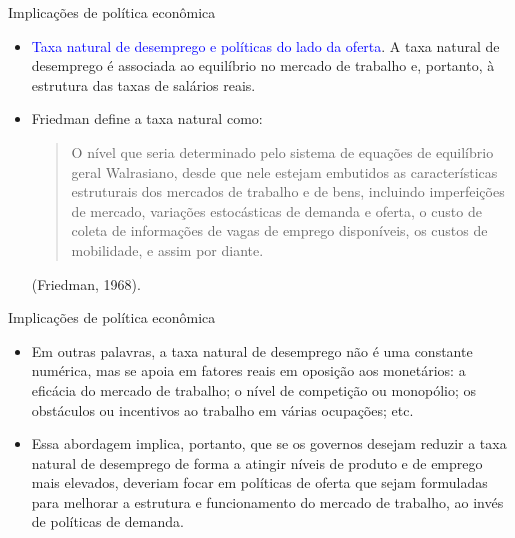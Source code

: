 \documentclass[10pt]{beamer}
\begin{document}
\begin{frame}{Implicações de política econômica}
    \begin{itemize}
        \item \textcolor{blue}{Taxa natural de desemprego e políticas do lado da oferta}. A taxa natural de desemprego é associada ao equilíbrio no mercado de trabalho e, portanto, à estrutura das taxas de salários reais.
        \bigskip
        \item Friedman define a taxa natural como:
        \begin{quote}
            O nível que seria determinado pelo sistema de equações de equilíbrio geral Walrasiano, desde que nele estejam embutidos as características estruturais dos mercados de trabalho e de bens, incluindo imperfeições de mercado, variações estocásticas de demanda e oferta, o custo de coleta de informações de vagas de emprego disponíveis, os custos de mobilidade, e assim por diante.
        \end{quote}
        \begin{flushright}
            (Friedman, 1968).
        \end{flushright}
    \end{itemize}    
\end{frame}

\begin{frame}{Implicações de política econômica}
    \begin{itemize}
        \item Em outras palavras, a taxa natural de desemprego não é uma constante numérica, mas se apoia em fatores reais em oposição aos monetários: a eficácia do mercado de trabalho; o nível de competição ou monopólio; os obstáculos ou incentivos ao trabalho em várias ocupações; etc.
        \bigskip
        \item Essa abordagem implica, portanto, que se os governos desejam reduzir a taxa natural de desemprego de forma a atingir níveis de produto e de emprego mais elevados, deveriam focar em políticas de oferta que sejam formuladas para melhorar a estrutura e funcionamento do mercado de trabalho, ao invés de políticas de demanda.
    \end{itemize}    
\end{frame}
\end{document}
